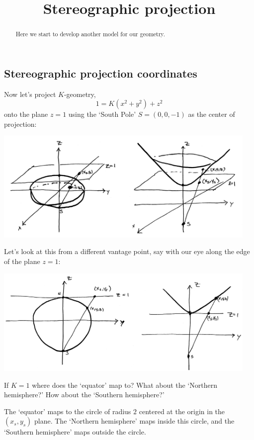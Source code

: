 \documentclass{ximera}
\title{Stereographic projection}
\begin{document}
\begin{abstract}
Here we start to develop another model for our geometry.
\end{abstract}
\maketitle


\subsection*{Stereographic projection coordinates}

Now let's project $K$-geometry,
\[
1=K\left(x^{2}+y^{2}\right)+z^{2} 
\]
onto the plane $z=1$ using the `South Pole' $S=(0,0,-1)$ as the center of
projection:
\begin{image}
\includegraphics[width=5in]{stereoProj.png}
\end{image}
Let's look at this from a different vantage point, say with our eye
along the edge of the plane $z=1$:
\begin{image}
\includegraphics[width=5in]{stereoCross.png}
\end{image}

\begin{problem}
  If $K=1$ where does the `equator' map to? What about the `Northern hemisphere?' How about the `Southern hemisphere?'
  \begin{freeResponse}
    The `equator' maps to the circle of radius $2$ centered at the
    origin in the $(x_s,y_s)$ plane.  The `Northern hemisphere' maps
    inside this circle, and the `Southern hemisphere' maps outside the
    circle.
  \end{freeResponse}
\end{problem}
\end{document}
